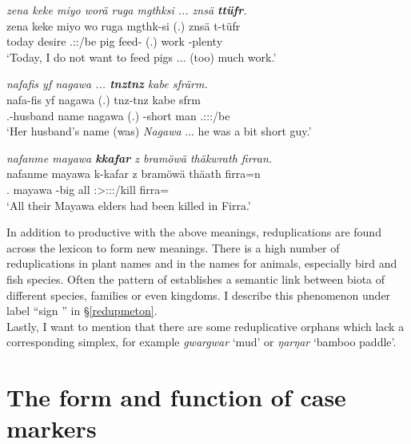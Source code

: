 \begin{exe}
	\ex \emph{zena keke miyo worä ruga mgthksi ... znsä \textbf{ttüfr}.}\\
	\gll zena keke miyo wo ruga mgthk-si (.) znsä t-tüfr\\
	today \Neg{} desire \Fsg.\Sbj:\Nonpast:\Ipfv/be pig feed-\Nmlz{} (.) work \Redup-plenty\\
	\trans `Today, I do not want to feed pigs ... (too) much work.'\\
	\label{ex709}
\end{exe}
\begin{exe}
	\ex \emph{nafafis yf nagawa ... \textbf{tnztnz} kabe sfrärm.}\\
	\gll nafa-fis yf nagawa (.) tnz-tnz kabe sfrm\\
	\Third.\Poss-husband name nagawa (.) \Redup-short man \Tsg.\Masc:\Sbj:\Pst:\Dur/be\\
	\trans `Her husband's name (was) \emph{Nagawa} ... he was a bit short guy.'\\
	\label{ex710}
\end{exe}
\begin{exe}
	\ex	\emph{nafanme mayawa \textbf{kkafar} z bramöwä thäkwrath firran.}\\
	\gll nafanme mayawa k-kafar z bramöwä thäath firra=n\\
	\Tnsg.\Poss{} mayawa \Redup-big \Iam{} all \Stpl:\Sbj>\Stpl:\Obj:\Pst:\Pfv/kill firra=\Loc\\
	\trans `All their Mayawa elders had been killed in Firra.'
	\label{ex721}
\end{exe}
	
In addition to productive  with the above meanings, reduplications are found across the lexicon to form new meanings. There is a high number of reduplications in plant names and in the names for animals, especially bird and fish species. Often the pattern of  establishes a semantic link between biota of different species, families or even kingdoms. I describe this phenomenon under label ``sign '' in \S\ref{redupmeton}.\\ 

Lastly, I want to mention that there are some reduplicative orphans which lack a corresponding simplex, for example \emph{gwargwar} `mud' or \emph{ŋarŋar} `bamboo paddle'.

\section{The form and function of case markers}\label{formfunccase}

